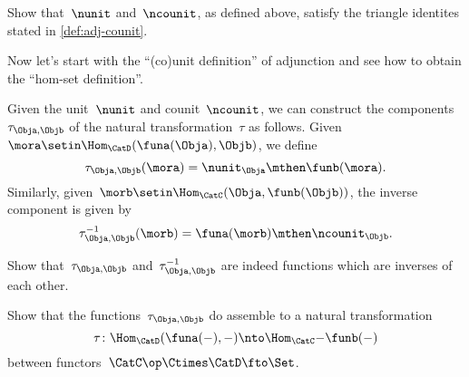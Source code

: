\begin{exercise}
    \label{ex:eta-epsilon-triangle}
    Show that~$\nunit$ and~$\ncounit$, as defined above, satisfy the triangle identites stated in \cref{def:adj-counit}.
\end{exercise}
\begin{solution}
    \missingsolution
\end{solution}

Now let's start with the ``(co)unit definition'' of adjunction and see how to obtain the ``hom-set definition''.

Given the unit~$\nunit$ and counit~$\ncounit$, we can construct the components~$\tau_{\Obja,\Objb}$ of the natural transformation~$\tau$ as follows.
Given~$\mora \setin \Hom_{\CatD}(\funa(\Obja),\Objb)$, we define
\begin{equation*}
    \tau_{\Obja,\Objb}(\mora) = \nunit_\Obja \mthen \funb(\mora).
\end{equation*}
Similarly, given~$\morb \setin \Hom_{\CatC}(\Obja,\funb(\Objb))$, the inverse component is given by
\begin{equation*}
    \tau_{\Obja,\Objb}^{-1}(\morb) = \funa(\morb) \mthen \ncounit_\Objb.
\end{equation*}

\begin{exercise}
    \label{ex:tau}
    Show that~$\tau_{\Obja,\Objb}$ and~$\tau_{\Obja,\Objb}^{-1}$ are indeed functions which are inverses of each other.
\end{exercise}
\begin{solution}
    \missingsolution
\end{solution}

\begin{exercise}
    \label{ex:tau2}
    Show that the functions~$\tau_{\Obja,\Objb}$ do assemble to a natural transformation
    \begin{equation*}
        \tau  \colon \Hom_{\CatD}(\funa(-) ,- ) \nto \Hom_{\CatC}{-}{\funb(-)}
    \end{equation*}
    between functors~$\CatC\op \Ctimes \CatD \fto \Set $.
\end{exercise}
\begin{solution}
    \missingsolution
\end{solution}
